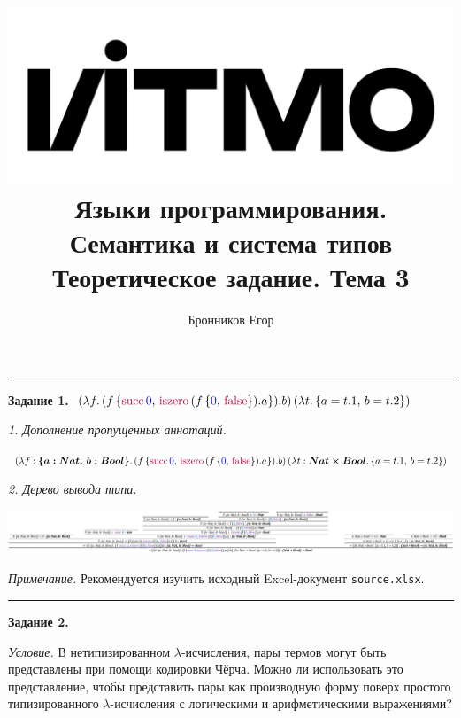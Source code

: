 \documentclass[landscape, 11pt]{report}
\title{
	\includegraphics[scale=0.07]{logo}\\
	\vspace{0.5em}
	Языки программирования. Семантика и система типов\\
	\vspace{0.2em}
	\Large Теоретическое задание. Тема 3
}
\author{Бронников Егор}
\date{}
\begin{document}
	
	
	\maketitle
	
	\vspace{-0.5cm}
	\hrule
	\vspace{0.5cm}
	
	
	\textbf{Задание 1.} $(\lambda f . \, (f \, \{ \text{\color{purple}succ} \, \text{\color{blue}0}, \, \text{\color{purple}iszero} \, (f \, \{\text{\color{blue}0}, \, \text{\color{purple}false}\}).a \}).b) \, (\lambda t . \, \{a = t.1, \, b = t.2\})$
	
	\vspace{0.2cm}
	
	\textit{1. Дополнение пропущенных аннотаций.}
	
	$(\lambda f : \boldsymbol{\{a: Nat, \, b: Bool\}}. \, (f \, \{ \text{\color{purple}succ} \, \text{\color{blue}0}, \, \text{\color{purple}iszero} \, (f \, \{\text{\color{blue}0}, \, \text{\color{purple}false}\}).a \}).b) \, (\lambda t : \boldsymbol{Nat \times Bool}. \, \{a = t.1, \, b = t.2\})$
	
	\vspace{0.2cm}
	
	\textit{2. Дерево вывода типа.}
	
	\includegraphics[scale=0.35]{task-1.png}

	\vspace{0.3cm}

	\small \textit{Примечание.} Рекомендуется изучить исходный Excel-документ \verb|source.xlsx|. \normalsize

	\vspace{0.2cm}
	\hrule
	\vspace{0.5cm}	
	
	
	\textbf{Задание 2.}

	\vspace{0.2cm}

	\textit{Условие.} В нетипизированном $\lambda$-исчисления, пары термов могут быть представлены при помощи кодировки Чёрча. Можно ли использовать это представление, чтобы представить пары как производную форму поверх простого типизированного $\lambda$-исчисления с логическими и арифметическими выражениями?
\end{document}
